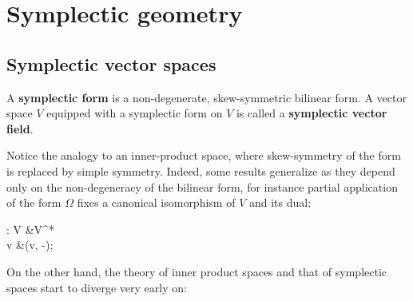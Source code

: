 \documentclass[main.tex]{subfiles}
\begin{document}
\chapter{Symplectic geometry}
\section{Symplectic vector spaces}
\begin{definition}
	A \textbf{symplectic form} is a non-degenerate, skew-symmetric bilinear form. A vector space $V$ equipped with a symplectic form on $V$ is called a \textbf{symplectic vector field}.
\end{definition}

Notice the analogy to an inner-product space, where skew-symmetry of the form is replaced by simple symmetry. Indeed, some results generalize as they depend only on the non-degeneracy of the bilinear form, for instance partial application of the form $\Omega$ fixes a canonical isomorphism of $V$ and its dual:
\begin{eqalign}
	\tilde\Omega : V &\longto V^*\\
	v &\longmapsto \Omega(v, -);
\end{eqalign}
On the other hand, the theory of inner product spaces and that of symplectic spaces start to diverge very early on:
\end{document}
